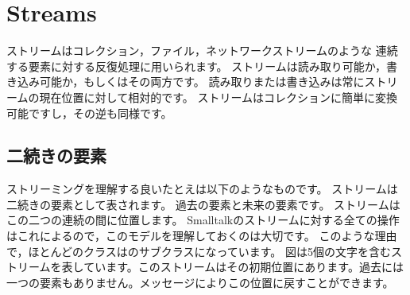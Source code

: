 \documentclass[a4paper,10pt,twoside]{book}
\begin{document}
	\renewcommand{\nnbb}[2]{} %
	\sloppy
\fi
\chapter{Streams}



ストリームはコレクション，ファイル，ネットワークストリームのような
連続する要素に対する反復処理に用いられます。
ストリームは読み取り可能か，書き込み可能か，もしくはその両方です。
読み取りまたは書き込みは常にストリームの現在位置に対して相対的です。
ストリームはコレクションに簡単に変換可能ですし，その逆も同様です。



\section{二続きの要素}

ストリーミングを理解する良いたとえは以下のようなものです。
ストリームは二続きの要素として表されます。
過去の要素と未来の要素です。
ストリームはこの二つの連続の間に位置します。
Smalltalkのストリームに対する全ての操作はこれによるので，このモデルを理解しておくのは大切です。
このような理由で，ほとんどのクラスはのサブクラスになっています。
図は5個の文字を含むストリームを表しています。このストリームはその初期位置にあります。\ie 過去には一つの要素もありません。メッセージによりこの位置に戻すことができます。
\end{document}
